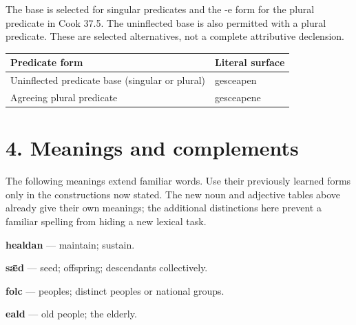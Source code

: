 The base is selected for singular predicates and the -e form for the plural predicate in Cook 37.5. The uninflected base is also permitted with a plural predicate. These are selected alternatives, not a complete attributive declension.

\par\begingroup
\fontsize{10.5}{13.2}\selectfont
\setlength{\LTleft}{0pt}\setlength{\LTright}{\fill}
\noindent
\begin{tabular}{@{}>{\raggedright\arraybackslash}p{83.56mm}>{\raggedright\arraybackslash}p{37.63mm}@{}}
\toprule
\textbf{Predicate form} & \textbf{Literal surface} \\
\midrule
Uninflected predicate base (singular or plural) & gesceapen \\
Agreeing plural predicate & gesceapene \\
\bottomrule
\end{tabular}
\par\endgroup

\section*{4. Meanings and complements}

The following meanings extend familiar words. Use their previously learned forms only in the constructions now stated. The new noun and adjective tables above already give their own meanings; the additional distinctions here prevent a familiar spelling from hiding a new lexical task.

\textbf{healdan} — maintain; sustain.

\textbf{sǣd} — seed; offspring; descendants collectively.

\textbf{folc} — peoples; distinct peoples or national groups.

\textbf{eald} — old people; the elderly.

